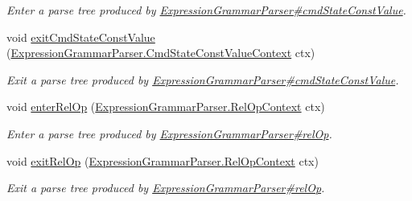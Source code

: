 \begin{DoxyCompactItemize}
\begin{DoxyCompactList}\small\item\em Enter a parse tree produced by \hyperlink{classgov_1_1nasa_1_1jpf_1_1inspector_1_1server_1_1expression_1_1parser_1_1_expression_grammar_parser_a86b5c0db5219832726e50e8e4b168ac2}{Expression\+Grammar\+Parser\#cmd\+State\+Const\+Value}. \end{DoxyCompactList}\item 
void \hyperlink{interfacegov_1_1nasa_1_1jpf_1_1inspector_1_1server_1_1expression_1_1parser_1_1_expression_grammar_listener_aaa6b843acc9e6e824bbf4a9c6b03f009}{exit\+Cmd\+State\+Const\+Value} (\hyperlink{classgov_1_1nasa_1_1jpf_1_1inspector_1_1server_1_1expression_1_1parser_1_1_expression_grammar_pa618023edddc6cf63ca4452111d0560c6}{Expression\+Grammar\+Parser.\+Cmd\+State\+Const\+Value\+Context} ctx)
\begin{DoxyCompactList}\small\item\em Exit a parse tree produced by \hyperlink{classgov_1_1nasa_1_1jpf_1_1inspector_1_1server_1_1expression_1_1parser_1_1_expression_grammar_parser_a86b5c0db5219832726e50e8e4b168ac2}{Expression\+Grammar\+Parser\#cmd\+State\+Const\+Value}. \end{DoxyCompactList}\item 
void \hyperlink{interfacegov_1_1nasa_1_1jpf_1_1inspector_1_1server_1_1expression_1_1parser_1_1_expression_grammar_listener_a0716a50ee7018a9f4fddeacb25777e78}{enter\+Rel\+Op} (\hyperlink{classgov_1_1nasa_1_1jpf_1_1inspector_1_1server_1_1expression_1_1parser_1_1_expression_grammar_parser_1_1_rel_op_context}{Expression\+Grammar\+Parser.\+Rel\+Op\+Context} ctx)
\begin{DoxyCompactList}\small\item\em Enter a parse tree produced by \hyperlink{classgov_1_1nasa_1_1jpf_1_1inspector_1_1server_1_1expression_1_1parser_1_1_expression_grammar_parser_af76d7c4bc312c622f71db248bbfd8f7e}{Expression\+Grammar\+Parser\#rel\+Op}. \end{DoxyCompactList}\item 
void \hyperlink{interfacegov_1_1nasa_1_1jpf_1_1inspector_1_1server_1_1expression_1_1parser_1_1_expression_grammar_listener_af9e45e54c7a64482972b57f192143756}{exit\+Rel\+Op} (\hyperlink{classgov_1_1nasa_1_1jpf_1_1inspector_1_1server_1_1expression_1_1parser_1_1_expression_grammar_parser_1_1_rel_op_context}{Expression\+Grammar\+Parser.\+Rel\+Op\+Context} ctx)
\begin{DoxyCompactList}\small\item\em Exit a parse tree produced by \hyperlink{classgov_1_1nasa_1_1jpf_1_1inspector_1_1server_1_1expression_1_1parser_1_1_expression_grammar_parser_af76d7c4bc312c622f71db248bbfd8f7e}{Expression\+Grammar\+Parser\#rel\+Op}. \end{DoxyCompactList}\item 

\end{DoxyCompactItemize}
